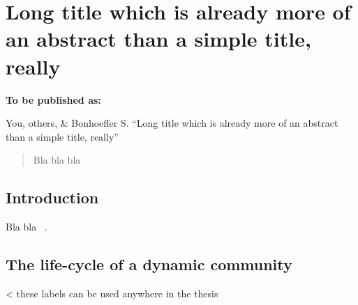 \chapter[Short title]{Long title which is already more of an abstract than a simple title, really}
\label{chapterspecificlabel:content}

\renewcommand\bibname{References}
 
  \vspace*{\fill}

  {\small
	  \textbf{To be published as:}
  \begin{adjustwidth}{1em}{0em}
	  You, others, \& Bonhoeffer S. ``Long title which is already more of an abstract than a simple title, really''
  \end{adjustwidth}}

\clearpage
\vspace*{\fill}
\begin{abstract}
Bla bla bla
\end{abstract}
\vspace*{\fill}
\newpage


\clearpage

\section{Introduction}
Bla bla ~\citep{fortunato2010community,fortunato2016community}.
\section{The life-cycle of a dynamic community}
\label{method:sec:lifecycle} < these labels can be used anywhere in the thesis


\newpage

{\small
	
}
